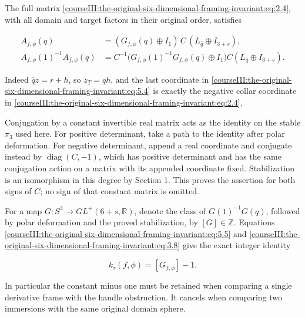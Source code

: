 The full matrix \eqref{courseIII:the-original-six-dimensional-framing-invariant:eq:2.4}, with all domain and target factors in their original order, satisfies

\begin{equation}
\begin{split}
 A_{f,\phi}(q)&=(G_{f,\phi}(q)\oplus I_1)\,
                  C\,(L_{\bar q}\oplus I_{3+s}),\\
 A_{f,\phi}(1)^{-1}A_{f,\phi}(q)
   &=C^{-1}\bigl(G_{f,\phi}(1)^{-1}G_{f,\phi}(q)\oplus I_1\bigr)C
                  (L_{\bar q}\oplus I_{3+s}).
 \end{split}
 \label{courseIII:the-original-six-dimensional-framing-invariant:eq:5.5}
\end{equation}

Indeed \(\bar qz=r+h\), so \(z_T=qh\), and the last coordinate in \eqref{courseIII:the-original-six-dimensional-framing-invariant:eq:5.4} is exactly the negative collar coordinate in \eqref{courseIII:the-original-six-dimensional-framing-invariant:eq:2.4}.

Conjugation by a constant invertible real matrix acts as the identity on the stable \(\pi_3\) used here. For positive determinant, take a path to the identity after polar deformation. For negative determinant, append a real coordinate and conjugate instead by \(\operatorname{diag}(C,-1)\), which has positive determinant and has the same conjugation action on a matrix with its appended coordinate fixed. Stabilization is an isomorphism in this degree by Section 1. This proves the assertion for both signs of \(C\); no sign of that constant matrix is omitted.

For a map \(G:S^3\to GL^+(6+s,\mathbb R)\), denote the class of \(G(1)^{-1}G(q)\), followed by polar deformation and the proved stabilization, by \([G]\in\mathbb Z\). Equations \eqref{courseIII:the-original-six-dimensional-framing-invariant:eq:5.5} and \eqref{courseIII:the-original-six-dimensional-framing-invariant:eq:3.8} give the exact integer identity

\begin{equation}
k_\tau(f,\phi)=[G_{f,\phi}]-1.
 \label{courseIII:the-original-six-dimensional-framing-invariant:eq:5.6}
\end{equation}

In particular the constant minus one must be retained when comparing a single derivative frame with the handle obstruction. It cancels when comparing two immersions with the same original domain sphere.

